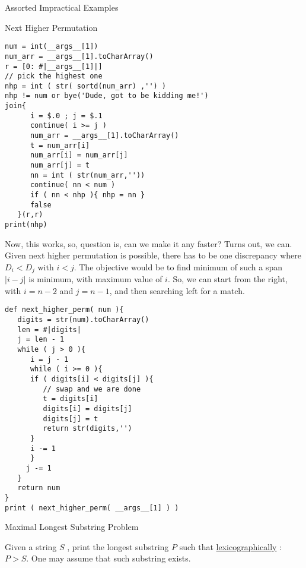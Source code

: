 \begin{section}{Assorted Impractical Examples}
\begin{subsection}{Next Higher Permutation}
\begin{center}\begin{minipage}{\linewidth}
\begin{lstlisting}[style=JexlStyle]
num = int(__args__[1])
num_arr = __args__[1].toCharArray() 
r = [0: #|__args__[1]|]
// pick the highest one 
nhp = int ( str( sortd(num_arr) ,'') )
nhp != num or bye('Dude, got to be kidding me!') 
join{
      i = $.0 ; j = $.1 
      continue( i >= j )
      num_arr = __args__[1].toCharArray() 
      t = num_arr[i]
      num_arr[i] = num_arr[j] 
      num_arr[j] = t 
      nn = int ( str(num_arr,''))
      continue( nn < num )
      if ( nn < nhp ){ nhp = nn }
      false 
   }(r,r)
print(nhp)
\end{lstlisting}  
\end{minipage}\end{center} 
Now, this works, so, question is, can we make it any faster?
Turns out, we can. Given next higher permutation is possible, there
has to be one discrepancy where $D_i < D_j $ with $ i < j $. 
The objective would be to find minimum of such a span $|i-j|$ is minimum, with maximum value of $i$.
So, we can start from the right, with $i=n-2$ and $j=n-1$, and then searching left 
for a match.

\begin{center}\begin{minipage}{\linewidth}
\begin{lstlisting}[style=JexlStyle]
def next_higher_perm( num ){
   digits = str(num).toCharArray() 
   len = #|digits|
   j = len - 1 
   while ( j > 0 ){
      i = j - 1 
      while ( i >= 0 ){
      if ( digits[i] < digits[j] ){
         // swap and we are done 
         t = digits[i]
         digits[i] = digits[j]
         digits[j] = t 
         return str(digits,'') 
      }
      i -= 1 
      }
     j -= 1 
   }
   return num
}
print ( next_higher_perm( __args__[1] ) )
\end{lstlisting}  
\end{minipage}\end{center} 
\end{subsection}

\begin{subsection}{Maximal Longest Substring Problem}

Given a string $S$ , print the longest substring $P$ such that  
\href{https://en.wikipedia.org/wiki/Lexicographical\_order}{lexicographically} : $P > S$. 
One may assume that such substring exists.


\end{subsection}
\end{section}
